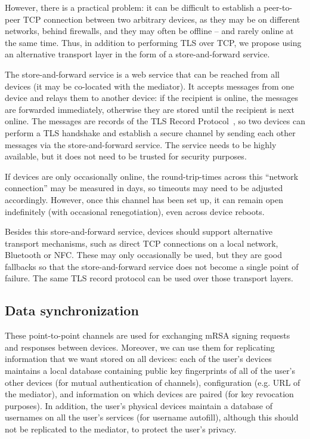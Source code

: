 However, there is a practical problem: it can be difficult to establish a peer-to-peer TCP
connection between two arbitrary devices, as they may be on different networks, behind firewalls,
and they may often be offline -- and rarely online at the same time. Thus, in addition to performing
TLS over TCP, we propose using an alternative transport layer in the form of a store-and-forward
service.

The store-and-forward service is a web service that can be reached from all devices (it may be
co-located with the mediator). It accepts messages from one device and relays them to another
device: if the recipient is online, the messages are forwarded immediately, otherwise they are
stored until the recipient is next online. The messages are records of the TLS Record
Protocol~\cite{TLS}, so two devices can perform a TLS handshake and establish a secure channel by
sending each other messages via the store-and-forward service. The service needs to be highly
available, but it does not need to be trusted for security purposes.

If devices are only occasionally online, the round-trip-times across this ``network connection'' may
be measured in days, so timeouts may need to be adjusted accordingly. However, once this channel has
been set up, it can remain open indefinitely (with occasional renegotiation), even across device
reboots.

Besides this store-and-forward service, devices should support alternative transport mechanisms,
such as direct TCP connections on a local network, Bluetooth or NFC. These may only occasionally be
used, but they are good fallbacks so that the store-and-forward service does not become a single
point of failure. The same TLS record protocol can be used over those transport layers.

\subsection{Data synchronization}\label{sec:devicesync}

These point-to-point channels are used for exchanging mRSA signing requests and responses between
devices. Moreover, we can use them for replicating information that we want stored on all devices:
each of the user's devices maintains a local database containing public key fingerprints of all of
the user's other devices (for mutual authentication of channels), configuration (e.g. URL of the
mediator), and information on which devices are paired (for key revocation purposes). In addition,
the user's physical devices maintain a database of usernames on all the user's services (for
username autofill), although this should not be replicated to the mediator, to protect the user's
privacy.

